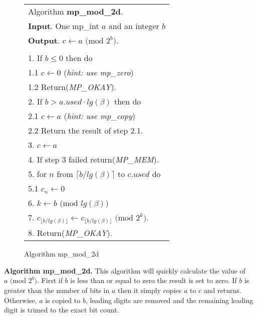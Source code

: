 \documentclass[b5paper]{book}
\begin{document}
\begin{figure}[!here]
\begin{small}
\begin{center}
\begin{tabular}{l}
\hline Algorithm \textbf{mp\_mod\_2d}. \\
\textbf{Input}.   One mp\_int $a$ and an integer $b$ \\
\textbf{Output}.  $c \leftarrow a \mbox{ (mod }2^b\mbox{)}$. \\
\hline \\
1.  If $b \le 0$ then do \\
\hspace{3mm}1.1  $c \leftarrow 0$ (\textit{hint: use mp\_zero}) \\
\hspace{3mm}1.2  Return(\textit{MP\_OKAY}). \\
2.  If $b > a.used \cdot lg(\beta)$ then do \\
\hspace{3mm}2.1  $c \leftarrow a$ (\textit{hint: use mp\_copy}) \\
\hspace{3mm}2.2  Return the result of step 2.1. \\
3.  $c \leftarrow a$ \\
4.  If step 3 failed return(\textit{MP\_MEM}). \\
5.  for $n$ from $\lceil b / lg(\beta) \rceil$ to $c.used$ do \\
\hspace{3mm}5.1  $c_n \leftarrow 0$ \\
6.  $k \leftarrow b \mbox{ (mod }lg(\beta)\mbox{)}$ \\
7.  $c_{\lfloor b / lg(\beta) \rfloor} \leftarrow c_{\lfloor b / lg(\beta) \rfloor} \mbox{ (mod }2^{k}\mbox{)}$. \\
8.  Return(\textit{MP\_OKAY}). \\
\hline
\end{tabular}
\end{center}
\end{small}
\caption{Algorithm mp\_mod\_2d}
\end{figure}

\textbf{Algorithm mp\_mod\_2d.}
This algorithm will quickly calculate the value of $a \mbox{ (mod }2^b\mbox{)}$.  First if $b$ is less than or equal to zero the 
result is set to zero.  If $b$ is greater than the number of bits in $a$ then it simply copies $a$ to $c$ and returns.  Otherwise, $a$ 
is copied to $b$, leading digits are removed and the remaining leading digit is trimed to the exact bit count.
\end{document}
